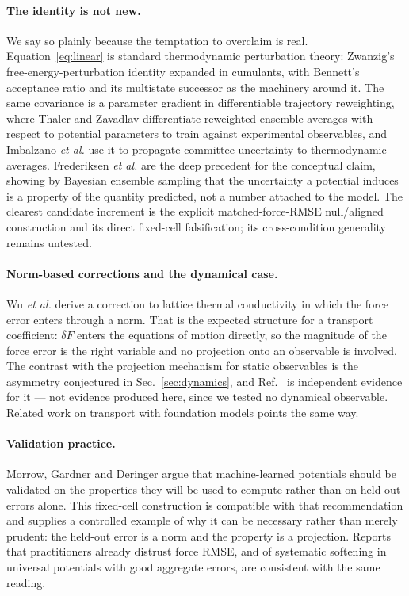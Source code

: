 \documentclass[aip,jcp,reprint,amsmath,amssymb,floatfix]{revtex4-2}
\begin{document}
\paragraph*{The identity is not new.} We say so plainly because the
temptation to overclaim is real. Equation~\eqref{eq:linear} is standard
thermodynamic perturbation theory: Zwanzig's free-energy-perturbation
identity\cite{Zwanzig1954} expanded in cumulants, with Bennett's acceptance
ratio\cite{Bennett1976} and its multistate successor\cite{ShirtsChodera2008} as
the machinery around it. The same covariance is a parameter
gradient in differentiable trajectory reweighting, where Thaler and
Zavadlav\cite{Thaler2021} differentiate reweighted ensemble averages with
respect to potential parameters to train against experimental observables, and
Imbalzano \emph{et al.}\cite{Imbalzano2021} use it to propagate committee
uncertainty to thermodynamic averages.
Frederiksen \emph{et al.}\cite{Frederiksen2004} are the deep precedent for the
conceptual claim, showing by Bayesian ensemble sampling that the uncertainty a
potential induces is a property of the quantity predicted, not a number
attached to the model. The clearest candidate increment is the explicit
matched-force-RMSE null/aligned construction and its direct fixed-cell
falsification; its cross-condition generality remains untested.

\paragraph*{Norm-based corrections and the dynamical case.} Wu \emph{et
al.}\cite{Wu2024} derive a correction to lattice thermal conductivity in which
the force error enters through a norm. That is the expected structure
for a transport coefficient: $\delta F$ enters the equations of motion directly,
so the magnitude of the force error is the right variable and no projection
onto an observable is involved. The contrast with the projection mechanism for
static observables is the asymmetry conjectured in
Sec.~\ref{sec:dynamics}, and Ref.~ is independent evidence
for it --- not evidence produced here, since we tested no dynamical
observable. Related work on transport with foundation models\cite{Pota2024}
points the same way.

\paragraph*{Validation practice.} Morrow, Gardner and
Deringer\cite{Morrow2023} argue that machine-learned potentials should be
validated on the properties they will be used to compute rather than on
held-out errors alone. This fixed-cell construction is compatible with that
recommendation and supplies a controlled example of why it can be necessary
rather than merely prudent: the held-out error
is a norm and the property is a projection. Reports
that practitioners already distrust force RMSE\cite{Kovacs2021}, and of
systematic softening in universal potentials with good aggregate
errors\cite{Deng2025}, are consistent with the same reading.
\end{document}
